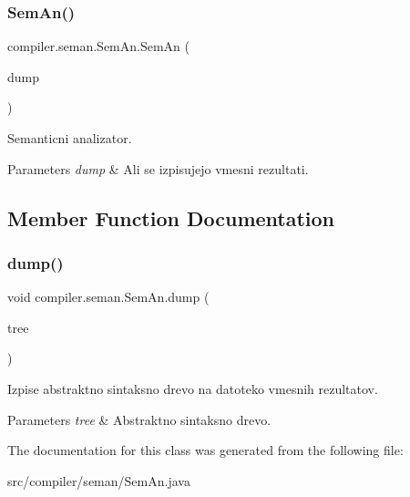 \subsubsection{\texorpdfstring{Sem\+An()}{SemAn()}}
{\footnotesize\ttfamily compiler.\+seman.\+Sem\+An.\+Sem\+An (\begin{DoxyParamCaption}\item[{boolean}]{dump }\end{DoxyParamCaption})}

Semanticni analizator.


\begin{DoxyParams}{Parameters}
{\em dump} & Ali se izpisujejo vmesni rezultati. \\
\hline
\end{DoxyParams}


\subsection{Member Function Documentation}
\mbox{\label{classcompiler_1_1seman_1_1_sem_an_a6a06b966a282738f572ff6c6ae0815f0}} 
\subsubsection{\texorpdfstring{dump()}{dump()}}
{\footnotesize\ttfamily void compiler.\+seman.\+Sem\+An.\+dump (\begin{DoxyParamCaption}\item[{\hyperlink{classcompiler_1_1abstr_1_1tree_1_1_abs_tree}{Abs\+Tree}}]{tree }\end{DoxyParamCaption})}

Izpise abstraktno sintaksno drevo na datoteko vmesnih rezultatov.


\begin{DoxyParams}{Parameters}
{\em tree} & Abstraktno sintaksno drevo. \\
\hline
\end{DoxyParams}


The documentation for this class was generated from the following file\+:\begin{DoxyCompactItemize}
\item 
src/compiler/seman/Sem\+An.\+java\end{DoxyCompactItemize}

